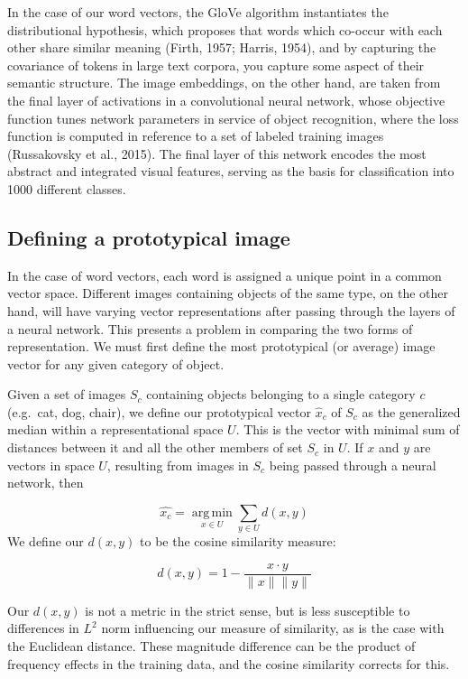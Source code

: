 \documentclass[10pt, letterpaper]{article}
\begin{document}
In the case of our word vectors, the GloVe algorithm instantiates the
distributional hypothesis, which proposes that words which co-occur with
each other share similar meaning (Firth, 1957; Harris, 1954), and by
capturing the covariance of tokens in large text corpora, you capture
some aspect of their semantic structure. The image embeddings, on the
other hand, are taken from the final layer of activations in a
convolutional neural network, whose objective function tunes network
parameters in service of object recognition, where the loss function is
computed in reference to a set of labeled training images (Russakovsky
et al., 2015). The final layer of this network encodes the most abstract
and integrated visual features, serving as the basis for classification
into 1000 different classes.

\subsection{Defining a prototypical
image}\label{defining-a-prototypical-image}

In the case of word vectors, each word is assigned a unique point in a
common vector space. Different images containing objects of the same
type, on the other hand, will have varying vector representations after
passing through the layers of a neural network. This presents a problem
in comparing the two forms of representation. We must first define the
most prototypical (or average) image vector for any given category of
object.

Given a set of images \(S_c\) containing objects belonging to a single
category \(c\) (e.g.~cat, dog, chair), we define our prototypical vector
\(\hat{x}_c\) of \(S_c\) as the generalized median within a
representational space \(U\). This is the vector with minimal sum of
distances between it and all the other members of set \(S_c\) in \(U\).
If \(x\) and \(y\) are vectors in space \(U\), resulting from images in
\(S_c\) being passed through a neural network, then

\[
 \hat{x_c} = \operatorname*{arg\,min}_{x\in U} \sum_{y\in U} d(x, y)
\] We define our \(d(x, y)\) to be the cosine similarity measure:

\[
d(x, y) = 1 - \frac{x\cdot y}{\|x\|\|y\|}
\]

Our \(d(x, y)\) is not a metric in the strict sense, but is less
susceptible to differences in \(L^2\) norm influencing our measure of
similarity, as is the case with the Euclidean distance. These magnitude
difference can be the product of frequency effects in the training data,
and the cosine similarity corrects for this.
\end{document}
